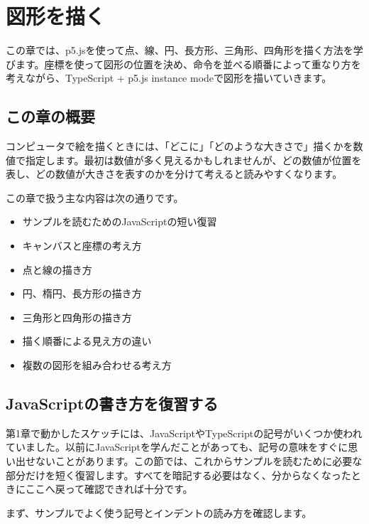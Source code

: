 \chapter{図形を描く}
\label{chap:drawing-shapes}

この章では、p5.jsを使って点、線、円、長方形、三角形、四角形を描く方法を学びます。座標を使って図形の位置を決め、命令を並べる順番によって重なり方を考えながら、TypeScript + p5.js instance modeで図形を描いていきます。

\section{この章の概要}

コンピュータで絵を描くときには、「どこに」「どのような大きさで」描くかを数値で指定します。最初は数値が多く見えるかもしれませんが、どの数値が位置を表し、どの数値が大きさを表すのかを分けて考えると読みやすくなります。

この章で扱う主な内容は次の通りです。

\begin{itemize}
    \item サンプルを読むためのJavaScriptの短い復習
    \item キャンバスと座標の考え方
    \item 点と線の描き方
    \item 円、楕円、長方形の描き方
    \item 三角形と四角形の描き方
    \item 描く順番による見え方の違い
    \item 複数の図形を組み合わせる考え方
\end{itemize}

\section{JavaScriptの書き方を復習する}

第1章で動かしたスケッチには、JavaScriptやTypeScriptの記号がいくつか使われていました。以前にJavaScriptを学んだことがあっても、記号の意味をすぐに思い出せないことがあります。この節では、これからサンプルを読むために必要な部分だけを短く復習します。すべてを暗記する必要はなく、分からなくなったときにここへ戻って確認できれば十分です。

まず、サンプルでよく使う記号とインデントの読み方を確認します。

